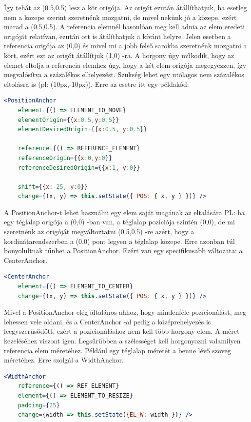 \documentclass[a4paper,12pt,oneside]{report}
\begin{document}
\begin{justify}
	Így tehát az (0.5,0.5) lesz a kör origója. Az origót ezután átállíthatjuk, ha esetleg nem a közepe szerint szeretnénk mozgatni, de mivel nekünk jó a közepe, ezért marad a (0.5,0.5). A referencia elemnél hasonlóan meg kell adnia az elem eredeti origóját relatívan, ezután ott is átálíthatjuk a kívánt helyre. Jelen esetben a referencia origója az (0,0) és mivel mi a jobb felső sarokba szeretnénk mozgatni a kört, ezért ezt az origót átállítjuk (1,0) -ra. A horgony úgy működik, hogy az elemet eltolja a referencia elemhez úgy, hogy a két elem origója megegyezzen, így megvalósítva a százalékos elhelyezést. Szükség lehet egy utólagos nem százalékos eltolásra is (pl: (10px,-10px)). Erre az esetre itt egy példakód:

	\begin{lstlisting}[language=jsx]
	<PositionAnchor 
	element={() => ELEMENT_TO_MOVE}
	elementOrigin={{x:0.5,y:0.5}}
	elementDesiredOrigin={{x:0.5, y:0.5}}

	reference={() => REFERENCE_ELEMENT}
	referenceOrigin={{x:0,y:0}}
	referenceDesiredOrigin={{x:1, y:0}}

	shift={{x:-25, y:0}}
	change={(x, y) => this.setState({ POS: { x, y } })} />
	\end{lstlisting}

	A PositionAnchor-t lehet használni egy elem saját magának az eltalására PL: ha egy téglalap origója a (0,0) -ban van, a téglalap pozíciója szintén (0,0), de mi szeretnénk az origóját megváltoztatni (0.5,0.5) -re azért, hogy a kordinátarendszerben a (0,0) pont legyen a téglalap közepe. Erre azonban túl bonyolultnak tűnhet a PositionAnchor. Ezért van egy specifikusabb változata: a CenterAnchor.

	\begin{lstlisting}[language=jsx]
	<CenterAnchor
	element={() => ELEMENT_TO_CENTER}
	change={(x, y) => this.setState({ POS: { x, y } })} />
	\end{lstlisting}

	Mivel a PositionAnchor elég általános ahhoz, hogy mindenféle pozícionálást, meg lehessen vele oldani, és a CenterAnchor -al pedig a középrehelyezés is leegyszerűsödött, ezért a pozícionáláshoz nem kell több horgony elem. A méret kezeléséhez viszont igen. Legsűrűbben a szélességet kell horgonyozni valamilyen referencia elem méretéhez. Például egy téglalap méretét a benne lévő szöveg méretéhez. Erre szolgál a WidthAnchor.

	\begin{lstlisting}[language=jsx]
	<WidthAnchor
	reference={() => REF_ELEMENT}
	element={() => ELEMENT_TO_RESIZE}
	padding={25}
	change={width => this.setState({EL_W: width })} />
	\end{lstlisting}


\end{justify}
\end{document}
